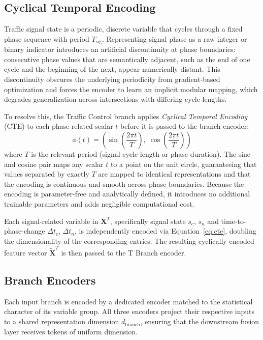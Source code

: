 \documentclass[journal]{IEEEtran}
\begin{document}
\subsection{Cyclical Temporal Encoding}

Traffic signal state is a periodic, discrete variable that cycles through a fixed phase sequence with period $T_\text{sig}$.
Representing signal phase as a raw integer or binary indicator introduces an artificial discontinuity at phase boundaries: consecutive phase values that are semantically adjacent, such as the end of one cycle and the beginning of the next, appear numerically distant.
This discontinuity obscures the underlying periodicity from gradient-based optimization and forces the encoder to learn an implicit modular mapping, which degrades generalization across intersections with differing cycle lengths.

To resolve this, the Traffic Control branch applies \emph{Cyclical Temporal Encoding} (CTE) to each phase-related scalar $t$ before it is passed to the branch encoder:
\begin{equation}
    \phi(t) = \left(\sin\!\left(\frac{2\pi t}{T}\right),\; \cos\!\left(\frac{2\pi t}{T}\right)\right)
    \label{eq:cte}
\end{equation}
where $T$ is the relevant period (signal cycle length or phase duration).
The sine and cosine pair maps any scalar $t$ to a point on the unit circle, guaranteeing that values separated by exactly $T$ are mapped to identical representations and that the encoding is continuous and smooth across phase boundaries.
Because the encoding is parameter-free and analytically defined, it introduces no additional trainable parameters and adds negligible computational cost.

Each signal-related variable in $\mathbf{X}^T$, specifically signal state $s_c$, $s_n$ and time-to-phase-change $\Delta t_c$, $\Delta t_n$, is independently encoded via Equation~\eqref{eq:cte}, doubling the dimensionality of the corresponding entries.
The resulting cyclically encoded feature vector $\tilde{\mathbf{X}}^T$ is then passed to the T Branch encoder.

\subsection{Branch Encoders}

Each input branch is encoded by a dedicated encoder matched to the statistical character of its variable group.
All three encoders project their respective inputs to a shared representation dimension $d_\text{branch}$, ensuring that the downstream fusion layer receives tokens of uniform dimension.
\end{document}
